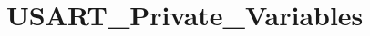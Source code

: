 \hypertarget{group___u_s_a_r_t___private___variables}{\section{U\-S\-A\-R\-T\-\_\-\-Private\-\_\-\-Variables}
\label{group___u_s_a_r_t___private___variables}
}
